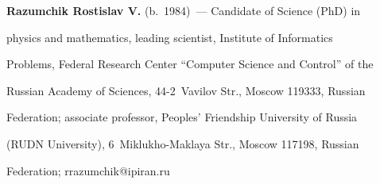 \noindent


\textbf{Razumchik Rostislav V.} (b.\ 1984)~--- Candidate of Science (PhD) in 


physics and mathematics, leading scientist, Institute of Informatics 


Problems, Federal Research Center ``Computer Science and Control'' of the 


Russian Academy of Sciences, 44-2~Vavilov Str., Moscow 119333, Russian 


Federation; associate professor, Peoples' Friendship University of Russia 


(RUDN University), 6~Miklukho-Maklaya Str., Moscow 117198, Russian 


Federation; \mbox{rrazumchik@ipiran.ru}





\label{end\stat}





\renewcommand{\bibname}{\protect\rm Литература}       


